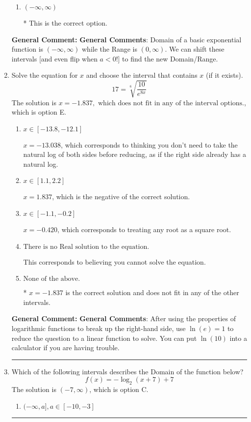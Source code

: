 \documentclass{extbook}[14pt]
\newcommand{\litem}[1]{\item #1

\rule{\textwidth}{0.4pt}}
\begin{document}
\begin{enumerate}
{\begin{enumerate}[label=\Alph*.]
$(-\infty, -6]$, which corresponds to using the correct vertical shift *if we wanted the Range* AND including the endpoint.
\item \( (-\infty, \infty) \)

* This is the correct option.
\end{enumerate}

\textbf{General Comment:} \textbf{General Comments}: Domain of a basic exponential function is $(-\infty, \infty)$ while the Range is $(0, \infty)$. We can shift these intervals [and even flip when $a<0$!] to find the new Domain/Range.
}
\litem{
 Solve the equation for $x$ and choose the interval that contains $x$ (if it exists).
\[  17 = \sqrt[6]{\frac{10}{e^{8x}}} \]
The solution is \( x = -1.837, \text{ which does not fit in any of the interval options.} \), which is option E.\begin{enumerate}[label=\Alph*.]
\item \( x \in [-13.8, -12.1] \)

$x = -13.038$, which corresponds to thinking you don't need to take the natural log of both sides before reducing, as if the right side already has a natural log.
\item \( x \in [1.1, 2.2] \)

$x = 1.837$, which is the negative of the correct solution.
\item \( x \in [-1.1, -0.2] \)

$x = -0.420$, which corresponds to treating any root as a square root.
\item \( \text{There is no Real solution to the equation.} \)

This corresponds to believing you cannot solve the equation.
\item \( \text{None of the above.} \)

* $x = -1.837$ is the correct solution and does not fit in any of the other intervals.
\end{enumerate}

\textbf{General Comment:} \textbf{General Comments}: After using the properties of logarithmic functions to break up the right-hand side, use $\ln(e) = 1$ to reduce the question to a linear function to solve. You can put $\ln(10)$ into a calculator if you are having trouble.
}
\litem{
Which of the following intervals describes the Domain of the function below?
\[ f(x) = -\log_2{(x+7)}+7 \]
The solution is \( (-7, \infty) \), which is option C.\begin{enumerate}[label=\Alph*.]
\item \( (-\infty, a], a \in [-10, -3] \)


\end{enumerate}}
\end{enumerate}
\end{document}
